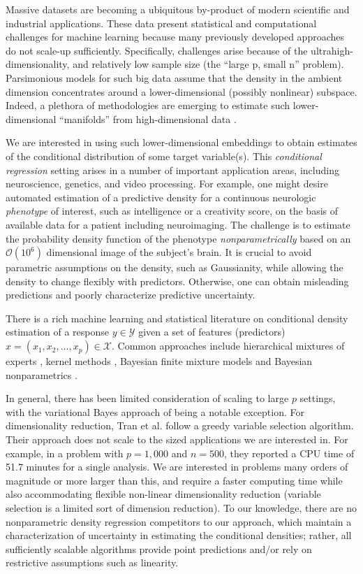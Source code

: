\documentclass{article}
\begin{document}
Massive datasets are becoming a ubiquitous by-product of modern scientific and industrial applications. These data present statistical and computational challenges for machine learning because many previously developed approaches do not scale-up sufficiently.  Specifically, challenges arise because of the ultrahigh-dimensionality, and relatively low sample size (the ``large p, small n'' problem).  Parsimonious models for such big data assume that the density in the ambient dimension concentrates around a lower-dimensional (possibly nonlinear) subspace.  Indeed, a plethora of methodologies are emerging to estimate such lower-dimensional ``manifolds'' from high-dimensional data \cite{Manifold, Maggioni}.  

We are interested in using such lower-dimensional embeddings to obtain estimates of the conditional distribution of some target variable(s).  This \emph{conditional regression} setting arises in a number of important application areas, including neuroscience, genetics, and video processing.  For example, one might desire automated estimation of a predictive density for a continuous neurologic {\em phenotype} of interest, such as intelligence or a creativity score, on the basis of available data for a patient including neuroimaging.  The challenge is to estimate the probability density function of the phenotype {\em nonparametrically} based on an $\mathcal{O}(10^6)$ dimensional image of the subject's brain.  It is crucial to avoid parametric assumptions on the density, such as Gaussianity, while allowing the density to change flexibly with predictors.  Otherwise, one can obtain misleading predictions and poorly characterize predictive uncertainty.

There is a rich machine learning and statistical literature on conditional density estimation of a response $y \in \mathcal{Y}$ given a set of features (predictors) $x=(x_1, x_2, \ldots, x_p)\in \mathcal{X}$. Common approaches include hierarchical mixtures of experts \cite{mixtureexperts,jiang1999}, kernel methods \cite{fan1996,fanyim2004,holmes2010,fu2011}, Bayesian finite mixture models \cite{nott2012,tran2012,norets2012} and Bayesian nonparametrics 
\cite{griffin06, dunson2007, DunsonPark, chung2009, tokdar2010}.  

In general, there has been limited consideration of scaling to large $p$ settings, with the variational Bayes approach of \cite{tran2012} being a notable exception. For dimensionality reduction, Tran et al. follow a greedy variable selection algorithm.  Their approach does not scale to the sized applications we are interested in. For example, in a problem with $p=1,000$ and $n=500$, they reported a CPU time of 51.7 minutes for a single analysis.  We are interested in problems many orders of magnitude or more larger than this, and require a faster computing time while also accommodating flexible non-linear dimensionality reduction (variable selection is a limited sort of dimension reduction).  To our knowledge, there are no nonparametric density regression competitors to our approach, which maintain a characterization of uncertainty in estimating the conditional densities; rather, all sufficiently scalable algorithms provide point predictions and/or rely on restrictive assumptions such as linearity.  
\end{document}
